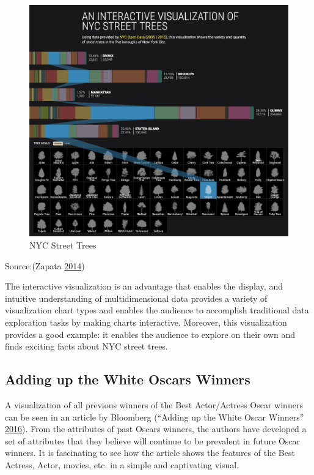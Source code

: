 \documentclass[]{book}
\begin{document}
\begin{figure}
\centering
\includegraphics{images/NY_trees.png}
\caption{NYC Street Trees}
\end{figure}

Source:(Zapata \protect\hyperlink{ref-trees}{2014})

The interactive visualization is an advantage that enables the display, and intuitive understanding of multidimensional data provides a variety of visualization chart types and enables the audience to accomplish traditional data exploration tasks by making charts interactive. Moreover, this visualization provides a good example: it enables the audience to explore on their own and finds exciting facts about NYC street trees.

\hypertarget{adding-up-the-white-oscars-winners}{%
\subsection{Adding up the White Oscars Winners}\label{adding-up-the-white-oscars-winners}}

A visualization of all previous winners of the Best Actor/Actress Oscar winners can be seen in an article by Bloomberg (``Adding up the White Oscar Winners'' \protect\hyperlink{ref-adding_oscars}{2016}). From the attributes of past Oscars winners, the authors have developed a set of attributes that they believe will continue to be prevalent in future Oscar winners. It is fascinating to see how the article shows the features of the Best Actress, Actor, movies, etc. in a simple and captivating visual.
\end{document}
